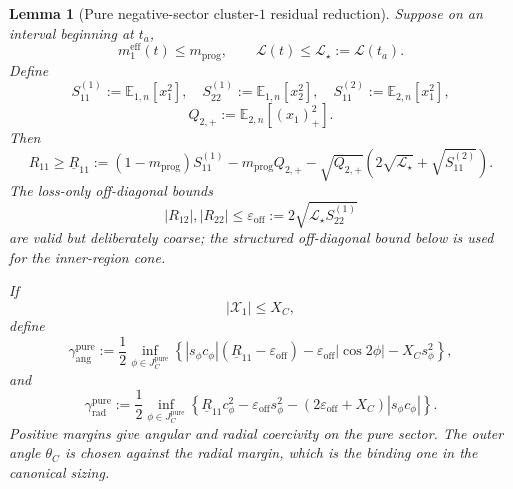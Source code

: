 \documentclass{article} %
\theoremstyle{plain}
\newtheorem{lemma}[theorem]{Lemma}
\theoremstyle{definition}
\theoremstyle{remark}
\begin{document}
\begin{lemma}[Pure negative-sector cluster-$1$ residual reduction]
Suppose on an interval beginning at $t_a$,
\[
m_1^{\mathrm{eff}}(t)\le m_{\mathrm{prog}},
\qquad
\mathcal L(t)\le\mathcal L_\star:=\mathcal L(t_a).
\]
Define
\[
S_{11}^{(1)}:=\mathbb E_{1,n}[x_1^2],
\quad
S_{22}^{(1)}:=\mathbb E_{1,n}[x_2^2],
\quad
S_{11}^{(2)}:=\mathbb E_{2,n}[x_1^2],
\]
\[
Q_{2,+}:=\mathbb E_{2,n}[(x_1)_+^2].
\]
Then
\[
\boxed{
R_{11}
\ge
\underline R_{11}
:=
(1-m_{\mathrm{prog}})S_{11}^{(1)}
-
m_{\mathrm{prog}}Q_{2,+}
-
\sqrt{Q_{2,+}}
\left(
2\sqrt{\mathcal L_\star}
+
\sqrt{S_{11}^{(2)}}
\right).
}
\tag{R11-lower}\label{eq:R11-lower}
\]
The loss-only off-diagonal bounds
\[
\boxed{
|R_{12}|,|R_{22}|
\le
\varepsilon_{\mathrm{off}}
:=
2\sqrt{\mathcal L_\star S_{22}^{(1)}}
}
\tag{coarse-offdiag}\label{eq:coarse-offdiag}
\]
are valid but deliberately coarse; the structured off-diagonal bound below
is used for the inner-region cone.

If
\[
|\mathcal X_1|\le X_C,
\]
define
\[
\boxed{
\gamma_{\mathrm{ang}}^{\mathrm{pure}}
:=
\frac12
\inf_{\phi\in J_C^{\mathrm{pure}}}
\left\{
|s_\phi c_\phi|
(\underline R_{11}-\varepsilon_{\mathrm{off}})
-
\varepsilon_{\mathrm{off}}|\cos2\phi|
-
X_Cs_\phi^2
\right\},
}
\]
and
\[
\boxed{
\gamma_{\mathrm{rad}}^{\mathrm{pure}}
:=
\frac12
\inf_{\phi\in J_C^{\mathrm{pure}}}
\left\{
\underline R_{11}c_\phi^2
-
\varepsilon_{\mathrm{off}}s_\phi^2
-
(2\varepsilon_{\mathrm{off}}+X_C)|s_\phi c_\phi|
\right\}.
}
\]
Positive margins give angular and radial coercivity on the pure sector.
The outer angle $\theta_C$ is chosen against the radial margin, which is the
binding one in the canonical sizing.
\end{lemma}
\end{document}
